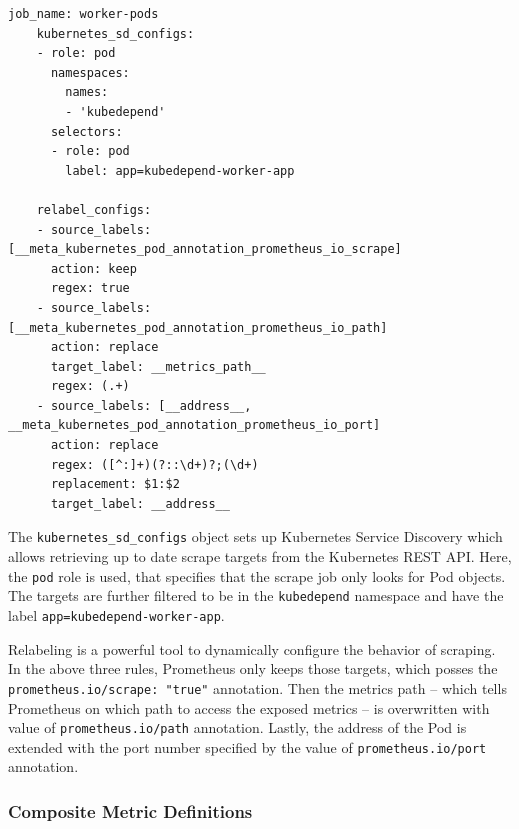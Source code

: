 \vspace{0.5cm}
\begin{minipage}{\linewidth}
	\begin{lstlisting}[caption={Prometheus scrape configuration for worker pods}, label={lst:worker-pods-scrape-job}]
	job_name: worker-pods
	kubernetes_sd_configs:
	- role: pod
	  namespaces:
	    names:
	    - 'kubedepend'
	  selectors:
	  - role: pod
	    label: app=kubedepend-worker-app
	
	relabel_configs:
	- source_labels: [__meta_kubernetes_pod_annotation_prometheus_io_scrape]
	  action: keep
	  regex: true
	- source_labels: [__meta_kubernetes_pod_annotation_prometheus_io_path]
	  action: replace
	  target_label: __metrics_path__
	  regex: (.+)
	- source_labels: [__address__, __meta_kubernetes_pod_annotation_prometheus_io_port]
	  action: replace
	  regex: ([^:]+)(?::\d+)?;(\d+)
	  replacement: $1:$2
	  target_label: __address__\end{lstlisting}
\end{minipage}

The \texttt{kubernetes\_sd\_configs} object sets up Kubernetes Service Discovery which allows retrieving up to date scrape targets from the Kubernetes REST API. Here, the \texttt{pod} role is used, that specifies that the scrape job only looks for Pod objects. The targets are further filtered to be in the \texttt{kubedepend} namespace and have the label \texttt{app=kubedepend-worker-app}.

Relabeling is a powerful tool to dynamically configure the behavior of scraping. In the above three rules, Prometheus only keeps those targets, which posses the \texttt{prometheus.io/scrape: "true"} annotation. Then the metrics path -- which tells Prometheus on which path to access the exposed metrics -- is overwritten with value of \texttt{prometheus.io/path} annotation. Lastly, the address of the Pod is extended with the port number specified by the value of \texttt{prometheus.io/port} annotation.

\subsubsection{Composite Metric Definitions}

